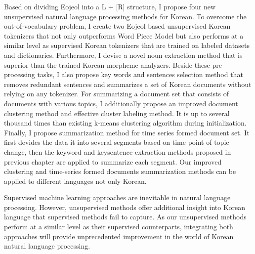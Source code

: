 \documentclass[oneside, ko,phd]{snuthesis_utf8_kor}
\begin{document}
\begin{abstractalt}
Based on dividing Eojeol into a L + [R] structure, I propose four new unsupervised natural language processing methods for Korean. 
To overcome the out-of-vocabulary problem, I create two Eojeol based unsupervised Korean tokenizers that not only outperforms Word Piece Model but also performs at a similar level as supervised Korean tokenizers that are trained on labeled datasets and dictionaries.
Furthermore, I devise a novel noun extraction method that is superior than the trained Korean morpheme analyzers.
Beside these pre-processing tasks, I also propose key words and sentences selection method that removes redundant sentences and summarizes a set of Korean documents without relying on any tokenizer.
For summarizing a document set that consists of documents with various topics, I additionally propose an improved document clustering method and effective cluster labeling method. It is up to several thousand times than existing k-means clustering algorithm during initialization. 
Finally, I propose summarization method for time series formed document set.
It first devides the data it into several segments based on time point of topic change, then the keyword and keysentence extraction methods proposed in previous chapter are applied to summarize each segment.
Our improved clustering and time-series formed documents summarization methods can be applied to different languages not only Korean.

Supervised machine learning approaches are inevitable in natural language processing.
However, unsupervised methods offer additional insight into Korean language that supervised methods fail to capture.
As our unsupervised methods perform at a similar level as their supervised counterparts, integrating both approaches will provide unprecedented improvement in the world of Korean natural language processing.
\end{abstractalt}

\acknowledgement{}
\end{document}
